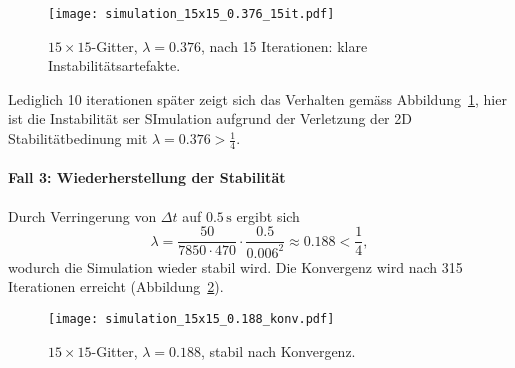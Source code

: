 \begin{figure}[htbp]
	\centering
	\texttt{[image: simulation\_15x15\_0.376\_15it.pdf]}
	\caption{\(15\times 15\)-Gitter, \(\lambda = 0.376\), nach 15 Iterationen: klare Instabilitätsartefakte.}
	\label{parallelisierung:fig:simulation_15x15_0.376_15it}
\end{figure}

Lediglich 10 iterationen später zeigt sich das Verhalten gemäss Abbildung~\ref{parallelisierung:fig:simulation_15x15_0.376_15it}, hier ist die Instabilität ser SImulation aufgrund der Verletzung der 2D Stabilitätbedinung mit \(\lambda = 0.376 > \frac{1}{4}\).

\paragraph{Fall 3: Wiederherstellung der Stabilität}  
Durch Verringerung von \(\Delta t\) auf \(0.5\,\mathrm{s}\) ergibt sich
\[
\lambda =
\frac{50}{7850 \cdot 470} \cdot \frac{0.5}{0.006^2}
\approx 0.188 < \frac14,
\]
wodurch die Simulation wieder stabil wird. Die Konvergenz wird nach 315 Iterationen erreicht (Abbildung~\ref{parallelisierung:fig:simulation_15x15_0.188_konv}).

\begin{figure}[htbp]
	\centering
	\texttt{[image: simulation\_15x15\_0.188\_konv.pdf]}
	\caption{\(15\times 15\)-Gitter, \(\lambda = 0.188\), stabil nach Konvergenz.}
	\label{parallelisierung:fig:simulation_15x15_0.188_konv}
\end{figure}








